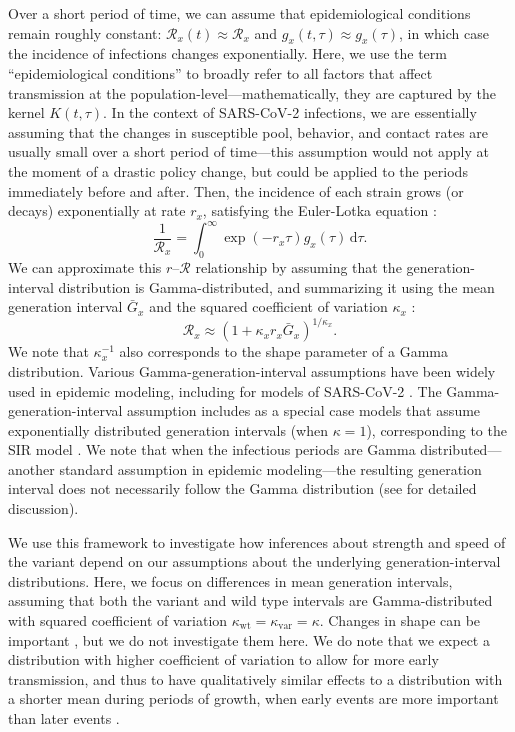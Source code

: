 \documentclass[12pt]{article}
\newcommand{\RR}{\ensuremath{{\mathcal R}}\xspace}
\newcommand{\dd}[1]{\ensuremath{\, \mathrm{d}#1}}
\newcommand{\dtau}{\dd{\tau}}
\begin{document}
Over a short period of time, we can assume that epidemiological conditions remain roughly constant: $\RR_x(t) \approx \RR_x$ and $g_x(t, \tau) \approx g_x(\tau)$, in which case the incidence of infections changes exponentially.
Here, we use the term ``epidemiological conditions'' to broadly refer to all factors that affect transmission at the population-level---mathematically, they are captured by the kernel $K(t, \tau)$.
In the context of SARS-CoV-2 infections, we are essentially assuming that the changes in susceptible pool, behavior, and contact rates are usually small over a short period of time---this assumption would not apply at the moment of a drastic policy change, but could be applied to the periods immediately before and after.
Then, the incidence of each strain grows (or decays) exponentially at rate $r_x$, satisfying the Euler-Lotka equation \citep{wallinga2007generation}:
\begin{equation}
\frac{1}{\RR_x} = \int_0^\infty \exp(- r_x \tau) g_x(\tau) \dtau.
\end{equation}
We can approximate this $r$--$\RR$ relationship by assuming that the generation-interval distribution is Gamma-distributed, and summarizing it using the mean generation interval $\bar{G}_x$ and the squared coefficient of variation $\kappa_x$ \citep{park2019practical}:
\begin{equation}
\RR_x \approx (1 + \kappa_x r_x \bar{G}_x)^{1/\kappa_x}.
\end{equation}
We note that $\kappa_x^{-1}$ also corresponds to the shape parameter of a Gamma distribution.
Various Gamma-generation-interval assumptions have been widely used in epidemic modeling, including for models of SARS-CoV-2 \citep{doi:10.1098/rsif.2020.0144}.
The Gamma-generation-interval assumption includes as a special case models that assume exponentially distributed generation intervals (when $\kappa=1$), corresponding to the SIR model \citep{anderson1991infectious}.
We note that when the infectious periods are Gamma distributed---another standard assumption in epidemic modeling---the resulting generation interval does not necessarily follow the Gamma distribution (see \cite{roberts2007model} for detailed discussion).

We use this framework to investigate how inferences about strength and speed of the variant depend on our assumptions about the underlying generation-interval distributions.
Here, we focus on differences in mean generation intervals, assuming that both the variant and wild type intervals are Gamma-distributed with squared coefficient of variation $\kappa_{\mathrm{wt}} = \kappa_{\mathrm{var}} = \kappa$.
Changes in shape can be important \citep{miller2010epidemics,svensson2015influence}, but we do not investigate them here. 
We do note that we expect a distribution with higher coefficient of variation to allow for more early transmission, and thus to have qualitatively similar effects to a distribution with a shorter mean during periods of growth, when early events are more important than later events \citep{park2019practical}.
\end{document}
